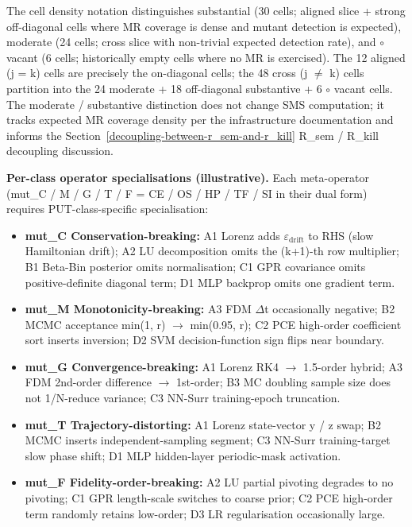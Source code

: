 \documentclass[12pt]{article}
\providecommand{\tightlist}{\setlength{\itemsep}{0pt}\setlength{\parskip}{0pt}}
\begin{document}
The cell density notation distinguishes \textbullet\textbullet substantial (30 cells;
aligned slice + strong off-diagonal cells where MR coverage is dense and
mutant detection is expected), \textbullet moderate (24 cells; cross slice with
non-trivial expected detection rate), and $\circ$ vacant (6 cells;
historically empty cells where no MR is exercised). The 12
aligned (j = k) cells are precisely the on-diagonal cells; the 48 cross
(j $\neq$ k) cells partition into the 24 \textbullet moderate + 18 \textbullet\textbullet off-diagonal
substantive + 6 $\circ$ vacant cells. The \textbullet moderate / \textbullet\textbullet substantive
distinction does not change SMS computation; it tracks expected MR
coverage density per the infrastructure documentation and informs the Section~\ref{decoupling-between-r_sem-and-r_kill} R\_sem /
R\_kill decoupling discussion.

\textbf{Per-class operator specialisations (illustrative).} Each
meta-operator (mut\_C / M / G / T / F = CE / OS / HP / TF / SI in their
dual form) requires PUT-class-specific specialisation:

\begin{itemize}
\tightlist
\item
  \textbf{mut\_C Conservation-breaking:} A1 Lorenz adds $\varepsilon_{\mathrm{drift}}$ to RHS
  (slow Hamiltonian drift); A2 LU decomposition omits the (k+1)-th row
  multiplier; B1 Beta-Bin posterior omits normalisation; C1 GPR
  covariance omits positive-definite diagonal term; D1 MLP backprop
  omits one gradient term.
\item
  \textbf{mut\_M Monotonicity-breaking:} A3 FDM $\Delta$t occasionally
  negative; B2 MCMC acceptance min(1, r) $\to$ min(0.95, r); C2 PCE
  high-order coefficient sort inserts inversion; D2 SVM
  decision-function sign flips near boundary.
\item
  \textbf{mut\_G Convergence-breaking:} A1 Lorenz RK4 $\to$ 1.5-order
  hybrid; A3 FDM 2nd-order difference $\to$ 1st-order; B3 MC doubling sample
  size does not 1/N-reduce variance; C3 NN-Surr training-epoch
  truncation.
\item
  \textbf{mut\_T Trajectory-distorting:} A1 Lorenz state-vector y / z
  swap; B2 MCMC inserts independent-sampling segment; C3 NN-Surr
  training-target slow phase shift; D1 MLP hidden-layer periodic-mask
  activation.
\item
  \textbf{mut\_F Fidelity-order-breaking:} A2 LU partial pivoting
  degrades to no pivoting; C1 GPR length-scale switches to coarse prior;
  C2 PCE high-order term randomly retains low-order; D3 LR
  regularisation occasionally large.
\end{itemize}
\end{document}
